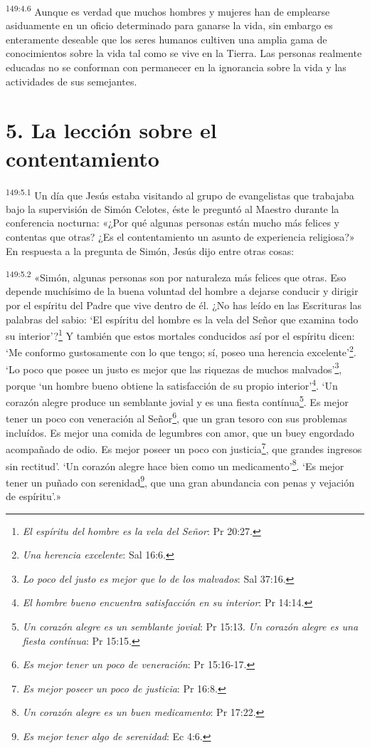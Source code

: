 \par
\textsuperscript{149:4.6} Aunque es verdad que muchos hombres y mujeres han de emplearse asiduamente en un oficio determinado para ganarse la vida, sin embargo es enteramente deseable que los seres humanos cultiven una amplia gama de conocimientos sobre la vida tal como se vive en la Tierra. Las personas realmente educadas no se conforman con permanecer en la ignorancia sobre la vida y las actividades de sus semejantes.

\section*{5. La lección sobre el contentamiento}
\par
\textsuperscript{149:5.1} Un día que Jesús estaba visitando al grupo de evangelistas que trabajaba bajo la supervisión de Simón Celotes, éste le preguntó al Maestro durante la conferencia nocturna: «¿Por qué algunas personas están mucho más felices y contentas que otras? ¿Es el contentamiento un asunto de experiencia religiosa?» En respuesta a la pregunta de Simón, Jesús dijo entre otras cosas:

\par
\textsuperscript{149:5.2} «Simón, algunas personas son por naturaleza más felices que otras. Eso depende muchísimo de la buena voluntad del hombre a dejarse conducir y dirigir por el espíritu del Padre que vive dentro de él. ¿No has leído en las Escrituras las palabras del sabio: `El espíritu del hombre es la vela del Señor que examina todo su interior'?\footnote{\textit{El espíritu del hombre es la vela del Señor}: Pr 20:27.} Y también que estos mortales conducidos así por el espíritu dicen: `Me conformo gustosamente con lo que tengo; sí, poseo una herencia excelente'\footnote{\textit{Una herencia excelente}: Sal 16:6.}. `Lo poco que posee un justo es mejor que las riquezas de muchos malvados'\footnote{\textit{Lo poco del justo es mejor que lo de los malvados}: Sal 37:16.}, porque `un hombre bueno obtiene la satisfacción de su propio interior'\footnote{\textit{El hombre bueno encuentra satisfacción en su interior}: Pr 14:14.}. `Un corazón alegre produce un semblante jovial y es una fiesta contínua\footnote{\textit{Un corazón alegre es un semblante jovial}: Pr 15:13. \textit{Un corazón alegre es una fiesta contínua}: Pr 15:15.}. Es mejor tener un poco con veneración al Señor\footnote{\textit{Es mejor tener un poco de veneración}: Pr 15:16-17.}, que un gran tesoro con sus problemas incluídos. Es mejor una comida de legumbres con amor, que un buey engordado acompañado de odio. Es mejor poseer un poco con justicia\footnote{\textit{Es mejor poseer un poco de justicia}: Pr 16:8.}, que grandes ingresos sin rectitud'. `Un corazón alegre hace bien como un medicamento'\footnote{\textit{Un corazón alegre es un buen medicamento}: Pr 17:22.}. `Es mejor tener un puñado con serenidad\footnote{\textit{Es mejor tener algo de serenidad}: Ec 4:6.}, que una gran abundancia con penas y vejación de espíritu'.»

